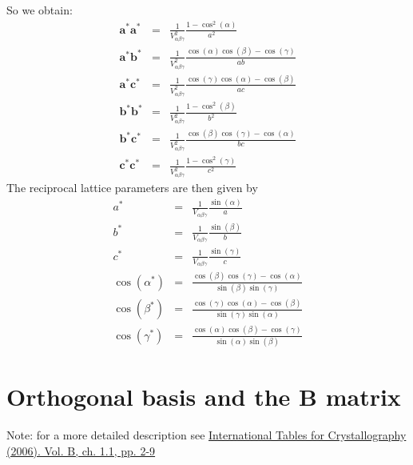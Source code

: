 \documentclass[prb]{revtex4}%
\begin{document}
So we obtain:
\begin{eqnarray}
  \textbf{a}^*\textbf{a}^* &=& \frac{1}{V_{\alpha\beta\gamma} ^2} \frac{1-\cos^2(\alpha)}{a^2}\\
  \textbf{a}^*\textbf{b}^* &=& \frac{1}{V_{\alpha\beta\gamma} ^2} \frac{\cos(\alpha) \cos(\beta)-\cos(\gamma)}{a b} \\
  \textbf{a}^*\textbf{c}^* &=& \frac{1}{V_{\alpha\beta\gamma} ^2} \frac{\cos(\gamma) \cos(\alpha)-\cos(\beta)}{a c}\\
  \textbf{b}^*\textbf{b}^* &=& \frac{1}{V_{\alpha\beta\gamma} ^2} \frac{1-\cos^2(\beta)}{b^2}\\
  \textbf{b}^*\textbf{c}^* &=& \frac{1}{V_{\alpha\beta\gamma} ^2} \frac{\cos(\beta) \cos(\gamma)-\cos(\alpha)}{b c}\\
  \textbf{c}^*\textbf{c}^* &=& \frac{1}{V_{\alpha\beta\gamma} ^2} \frac{1-\cos^2(\gamma)}{c^2}
\end{eqnarray}
The reciprocal lattice parameters are then given by
\begin{eqnarray}
  a^* &=& \frac{1}{V_{\alpha\beta\gamma} } \frac{\sin(\alpha)}{a}\label{as}\\
  b^* &=& \frac{1}{V_{\alpha\beta\gamma} } \frac{\sin(\beta)}{b}\label{bs}\\
  c^* &=& \frac{1}{V_{\alpha\beta\gamma} } \frac{\sin(\gamma)}{c}\label{cs}\\
  \cos(\alpha^*) &=& \frac{\cos(\beta) \cos(\gamma)-\cos(\alpha)}{\sin(\beta)\sin(\gamma)}\label{alphas}\\
  \cos(\beta^*) &=& \frac{\cos(\gamma) \cos(\alpha)-\cos(\beta)}{\sin(\gamma)\sin(\alpha)}\label{betas}\\
  \cos(\gamma^*) &=& \frac{\cos(\alpha) \cos(\beta)-\cos(\gamma)}{\sin(\alpha)\sin(\beta)}\label{gammas}
\end{eqnarray}

\section{Orthogonal basis and the B matrix}\label{Bsection}

Note: for a more detailed description see \href{http://it.iucr.org/Ba/ch1o1v0001/}{International Tables for Crystallography (2006). Vol. B, ch. 1.1, pp. 2-9 }
\end{document}
